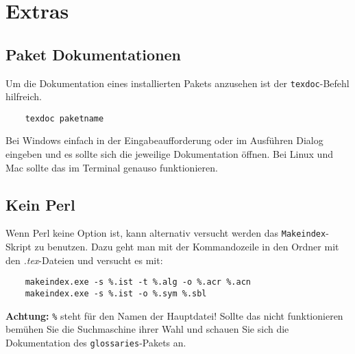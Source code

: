 \section{Extras}
\subsection{Paket Dokumentationen}
Um die Dokumentation eines installierten Pakets anzusehen ist der \verb|texdoc|-Befehl hilfreich.
\begin{lstlisting}
	texdoc paketname
\end{lstlisting}
Bei Windows einfach in der Eingabeaufforderung oder im Ausführen Dialog eingeben und es sollte sich die jeweilige Dokumentation öffnen. Bei Linux und Mac sollte das im Terminal genauso funktionieren.

\subsection{Kein Perl}\label{sec:noperl}
Wenn Perl keine Option ist, kann alternativ versucht werden das \verb|Makeindex|-Skript zu benutzen. Dazu geht man mit der Kommandozeile in den Ordner mit den \textit{.tex}-Dateien und versucht es mit:
\begin{lstlisting}
	makeindex.exe -s %.ist -t %.alg -o %.acr %.acn
	makeindex.exe -s %.ist -o %.sym %.sbl
\end{lstlisting}
\textbf{Achtung:} \verb|%| steht für den Namen der Hauptdatei!
Sollte das nicht funktionieren bemühen Sie die Suchmaschine ihrer Wahl und schauen Sie sich die Dokumentation des \verb|glossaries|-Pakets an.
